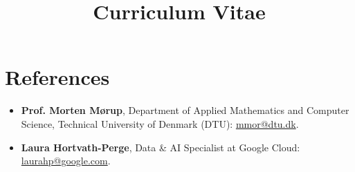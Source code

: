 \documentclass[11pt,a4paper]{moderncv}
\title{Curriculum Vitae}
\begin{document}
\makecvtitle

\section*{References}

\begin{itemize}
    \item \textbf{Prof. Morten Mørup}, Department of Applied Mathematics and Computer Science, Technical University of Denmark (DTU): \href{mailto:mmor@dtu.dk}{mmor@dtu.dk}.
    \item \textbf{Laura Hortvath-Perge}, Data \& AI Specialist at Google Cloud: \href{mailto:laurahp@google.com}{laurahp@google.com}.
\end{itemize}
\end{document}

